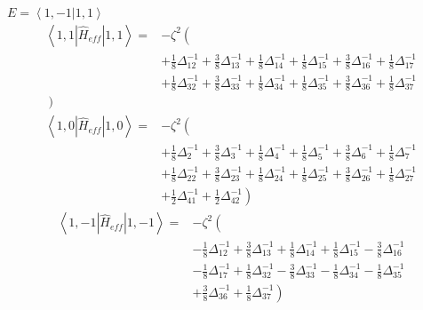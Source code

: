 \documentclass[11pt]{article}
\begin{document}
$E=\left\langle1,-1|1,1\right\rangle$\newline\newline
\begin{equation*}\begin{split}\left\langle1,1\left|\hat{H}_{eff}\right|1,1\right\rangle=&-\zeta^2\left(\right.\\
&+\frac{1}{8}\Delta_{12}^{-1}+\frac{3}{8}\Delta_{13}^{-1}+\frac{1}{8}\Delta_{14}^{-1}+\frac{1}{8}\Delta_{15}^{-1}+\frac{3}{8}\Delta_{16}^{-1}+\frac{1}{8}\Delta_{17}^{-1}\\
&+\frac{1}{8}\Delta_{32}^{-1}+\frac{3}{8}\Delta_{33}^{-1}+\frac{1}{8}\Delta_{34}^{-1}+\frac{1}{8}\Delta_{35}^{-1}+\frac{3}{8}\Delta_{36}^{-1}+\frac{1}{8}\Delta_{37}^{-1}\\
\left.\right)\end{split}\end{equation*}\newline
\begin{equation*}\begin{split}\left\langle1,0\left|\hat{H}_{eff}\right|1,0\right\rangle=&-\zeta^2\left(\right.\\
&+\frac{1}{8}\Delta_{2}^{-1}+\frac{3}{8}\Delta_{3}^{-1}+\frac{1}{8}\Delta_{4}^{-1}+\frac{1}{8}\Delta_{5}^{-1}+\frac{3}{8}\Delta_{6}^{-1}+\frac{1}{8}\Delta_{7}^{-1}\\
&+\frac{1}{8}\Delta_{22}^{-1}+\frac{3}{8}\Delta_{23}^{-1}+\frac{1}{8}\Delta_{24}^{-1}+\frac{1}{8}\Delta_{25}^{-1}+\frac{3}{8}\Delta_{26}^{-1}+\frac{1}{8}\Delta_{27}^{-1}\\
&+\frac{1}{2}\Delta_{41}^{-1}+\frac{1}{2}\Delta_{42}^{-1}\left.\right)\end{split}\end{equation*}\newline
\begin{equation*}\begin{split}\left\langle1,-1\left|\hat{H}_{eff}\right|1,-1\right\rangle=&-\zeta^2\left(\right.\\
&-\frac{1}{8}\Delta_{12}^{-1}+\frac{3}{8}\Delta_{13}^{-1}+\frac{1}{8}\Delta_{14}^{-1}+\frac{1}{8}\Delta_{15}^{-1}-\frac{3}{8}\Delta_{16}^{-1}\\
&-\frac{1}{8}\Delta_{17}^{-1}+\frac{1}{8}\Delta_{32}^{-1}-\frac{3}{8}\Delta_{33}^{-1}-\frac{1}{8}\Delta_{34}^{-1}-\frac{1}{8}\Delta_{35}^{-1}\\
&+\frac{3}{8}\Delta_{36}^{-1}+\frac{1}{8}\Delta_{37}^{-1}\left.\right)\end{split}\end{equation*}\newline
\end{document}
